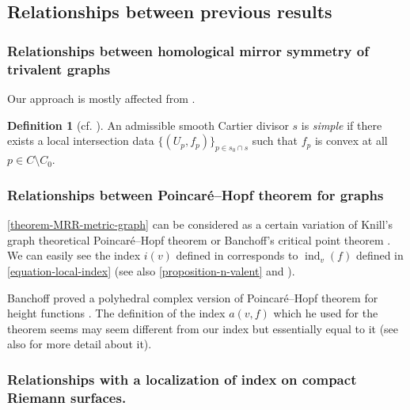\documentclass[a4paper,dvipdfmx,reqno,12pt]{amsart}
\theoremstyle{definition}
\newtheorem{definition}[theorem]{Definition}
\newcommand{\opn}[1]{\operatorname{#1}}
\numberwithin{equation}{section}
\begin{document}
\subsection{Relationships between previous results}
\label{section-tropical-curve-note}


\subsubsection{Relationships between
homological mirror symmetry of trivalent graphs}
\label{section-syz-trivalent-graph}

Our approach is mostly affected from 
\cite{auroux2022lagrangian}.

\begin{definition}[{cf. \cite{auroux2022lagrangian}}]
An admissible smooth Cartier divisor $s$ is 
\emph{simple} if there exists a local intersection data
$\{(U_p,f_p)\}_{p\in s_0\cap s}$ such that
$f_p$ is convex at all $p\in C\setminus C_0$.
\end{definition}

\subsubsection{Relationships between 
Poincar\'e--Hopf theorem for graphs}

\cref{theorem-MRR-metric-graph} can be considered 
as a certain variation of Knill's graph 
theoretical Poincar\'e--Hopf theorem \cite{knill2012graph}
or 
Banchoff's critical point theorem \cite{MR225327}.
We can easily see the index $i(v)$ defined in 
\cite[3]{knill2012graph}
corresponds to $\opn{ind}_v(f)$ defined in 
\cref{equation-local-index} (see also 
\cref{proposition-n-valent} and \cite[7]{knill2012graph}).

Banchoff proved a polyhedral complex version of Poincar\'e--Hopf theorem
for height functions \cite[Theorem 1]{MR225327}.
The definition of the index $a(v,f)$ 
\cite[p.246]{MR225327} which 
he used for the theorem seems may seem different 
from our index but essentially equal to it
(see also \cite[p.143-144]{grunert2017piecewise} 
for more detail about it).





\subsubsection{Relationships with a localization of 
index on compact Riemann surfaces.}
\end{document}
